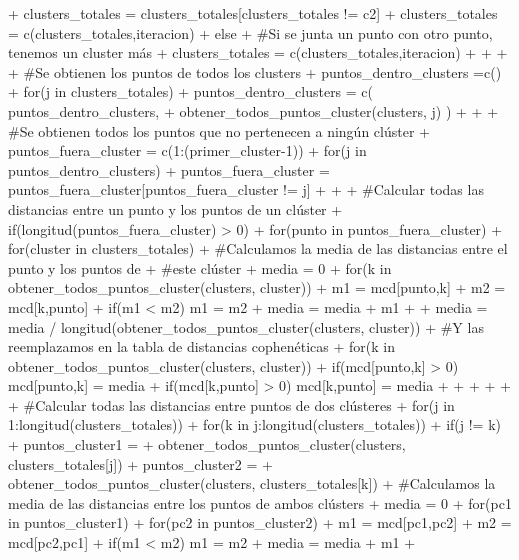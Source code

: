 \documentclass[parskip=full]{scrartcl}
\begin{document}
\begin{Schunk}
\begin{Sinput}
{{{+         clusters_totales = clusters_totales[clusters_totales != c2]
+         clusters_totales = c(clusters_totales,iteracion)
+       } else { 
+         #Si se junta un punto con otro punto, tenemos un cluster más
+         clusters_totales = c(clusters_totales,iteracion)
+       }
+       
+       
+       #Se obtienen los puntos de todos los clusters
+       puntos_dentro_clusters =c()
+       for(j in clusters_totales) {
+         puntos_dentro_clusters = c( puntos_dentro_clusters, 
+         obtener_todos_puntos_cluster(clusters, j) )
+       }
+       
+       #Se obtienen todos los puntos que no pertenecen a ningún clúster
+       puntos_fuera_cluster = c(1:(primer_cluster-1))
+       for(j in puntos_dentro_clusters) {
+         puntos_fuera_cluster = puntos_fuera_cluster[puntos_fuera_cluster != j]
+       }
+       
+       #Calcular todas las distancias entre un punto y los puntos de un clúster
+       if(longitud(puntos_fuera_cluster) > 0){
+         for(punto in puntos_fuera_cluster){
+           for(cluster in clusters_totales) {
+             #Calculamos la media de las distancias entre el punto y los puntos de 
+             #este clúster
+             media = 0
+             for(k in obtener_todos_puntos_cluster(clusters, cluster)){
+               m1 = mcd[punto,k]
+               m2 = mcd[k,punto]
+               if(m1 < m2){ m1 = m2 }
+               media = media + m1
+             }
+             media = media / longitud(obtener_todos_puntos_cluster(clusters, cluster))
+             #Y las reemplazamos en la tabla de distancias cophenéticas
+             for(k in obtener_todos_puntos_cluster(clusters, cluster)){
+               if(mcd[punto,k] > 0){ mcd[punto,k] = media }
+               if(mcd[k,punto] > 0){ mcd[k,punto] = media }
+             }
+           }
+         }
+       }
+       
+       #Calcular todas las distancias entre puntos de dos clústeres
+       for(j in 1:longitud(clusters_totales)){
+         for(k in j:longitud(clusters_totales)) {
+           if(j != k){
+             puntos_cluster1 = 
+ 			obtener_todos_puntos_cluster(clusters, clusters_totales[j])
+             puntos_cluster2 = 
+ 			obtener_todos_puntos_cluster(clusters, clusters_totales[k])
+             #Calculamos la media de las distancias entre los puntos de ambos clústers
+             media = 0
+             for(pc1 in puntos_cluster1){
+               for(pc2 in puntos_cluster2){
+                 m1 = mcd[pc1,pc2]
+                 m2 = mcd[pc2,pc1]
+                 if(m1 < m2){ m1 = m2 }
+                 media = media + m1
+               }
}}}}}}
\end{Sinput}
\end{Schunk}
\end{document}
